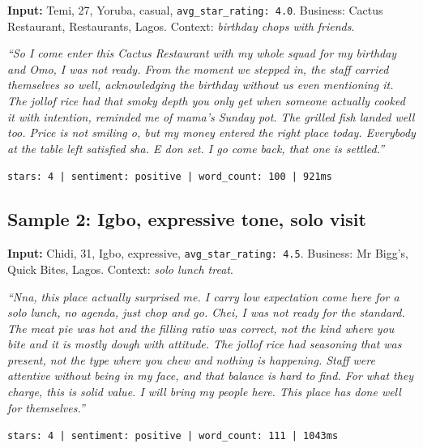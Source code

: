 \documentclass[11pt]{article}
\begin{document}
\noindent\textbf{Input:} Temi, 27, Yoruba, casual, \texttt{avg\_star\_rating: 4.0}. Business: Cactus Restaurant, Restaurants, Lagos. Context: \textit{birthday chops with friends}.

\smallskip
{\small\itshape ``So I come enter this Cactus Restaurant with my whole squad for my birthday and Omo, I was not ready. From the moment we stepped in, the staff carried themselves so well, acknowledging the birthday without us even mentioning it. The jollof rice had that smoky depth you only get when someone actually cooked it with intention, reminded me of mama's Sunday pot. The grilled fish landed well too. Price is not smiling o, but my money entered the right place today. Everybody at the table left satisfied sha. E don set. I go come back, that one is settled.''}

\smallskip\noindent\texttt{stars: 4 | sentiment: positive | word\_count: 100 | 921ms}


\subsection*{Sample 2: Igbo, expressive tone, solo visit}

\noindent\textbf{Input:} Chidi, 31, Igbo, expressive, \texttt{avg\_star\_rating: 4.5}. Business: Mr Bigg's, Quick Bites, Lagos. Context: \textit{solo lunch treat}.

\smallskip
{\small\itshape ``Nna, this place actually surprised me. I carry low expectation come here for a solo lunch, no agenda, just chop and go. Chei, I was not ready for the standard. The meat pie was hot and the filling ratio was correct, not the kind where you bite and it is mostly dough with attitude. The jollof rice had seasoning that was present, not the type where you chew and nothing is happening. Staff were attentive without being in my face, and that balance is hard to find. For what they charge, this is solid value. I will bring my people here. This place has done well for themselves.''}

\smallskip\noindent\texttt{stars: 4 | sentiment: positive | word\_count: 111 | 1043ms}
\end{document}
